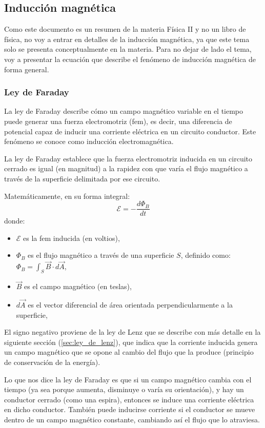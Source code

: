 \subsection{Inducción magnética}

Como este documento es un resumen de la materia Física II y no un libro de física, no voy a entrar en detalles de la inducción magnética, ya que este tema solo se presenta conceptualmente en la materia. Para no dejar de lado el tema, voy a presentar la ecuación que describe el fenómeno de inducción magnética de forma general.

\subsubsection{Ley de Faraday}

La ley de Faraday describe cómo un campo magnético variable en el tiempo puede generar una fuerza electromotriz (fem), es decir, una diferencia de potencial capaz de inducir una corriente eléctrica en un circuito conductor. Este fenómeno se conoce como inducción electromagnética.

La ley de Faraday establece que la fuerza electromotriz inducida en un circuito cerrado es igual (en magnitud) a la rapidez con que varía el flujo magnético a través de la superficie delimitada por ese circuito.

Matemáticamente, en su forma integral:
\[
  \mathcal{E} = -\frac{d\Phi_B}{dt}
\]
donde:
\begin{itemize}
  \item \(\mathcal{E}\) es la fem inducida (en voltios),
  \item \(\Phi_B\) es el flujo magnético a través de una superficie $S$, definido como: \(\Phi_B = \int_S \vec{B} \cdot d\vec{A}\),
  \item \(\vec{B}\) es el campo magnético (en teslas),
  \item \(d\vec{A}\) es el vector diferencial de área orientada perpendicularmente a la superficie,
\end{itemize}

El signo negativo proviene de la ley de Lenz que se describe con más detalle en la siguiente sección (\ref{sec:ley_de_lenz}), que indica que la corriente inducida genera un campo magnético que se opone al cambio del flujo que la produce (principio de conservación de la energía).

Lo que nos dice la ley de Faraday es que si un campo magnético cambia con el tiempo (ya sea porque aumenta, disminuye o varía su orientación), y hay un conductor cerrado (como una espira), entonces se induce una corriente eléctrica en dicho conductor.
También puede inducirse corriente si el conductor se mueve dentro de un campo magnético constante, cambiando así el flujo que lo atraviesa.

